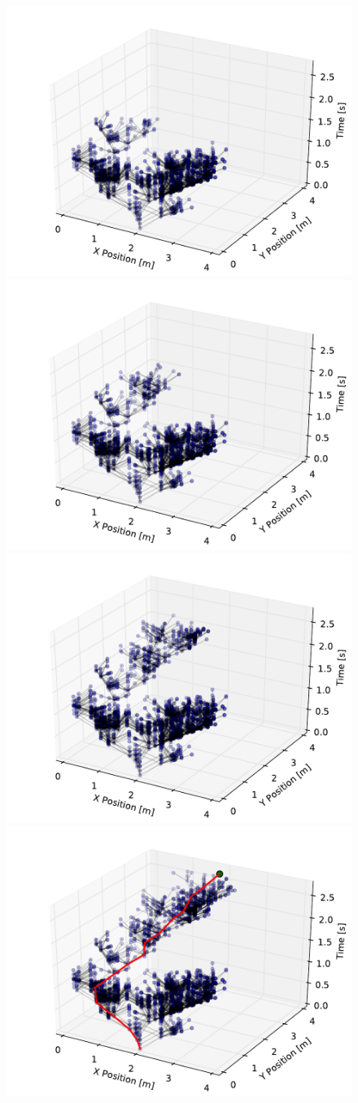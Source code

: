 \begin{figure}[h!]
    \includegraphics[width=0.32\linewidth]{figs/tree_5} \\
    \includegraphics[width=0.32\linewidth]{figs/tree_6}
    \includegraphics[width=0.32\linewidth]{figs/tree_7}
    \includegraphics[width=0.32\linewidth]{figs/tree_8}
    \caption{}
    \label{fig:tree}
\end{figure}


